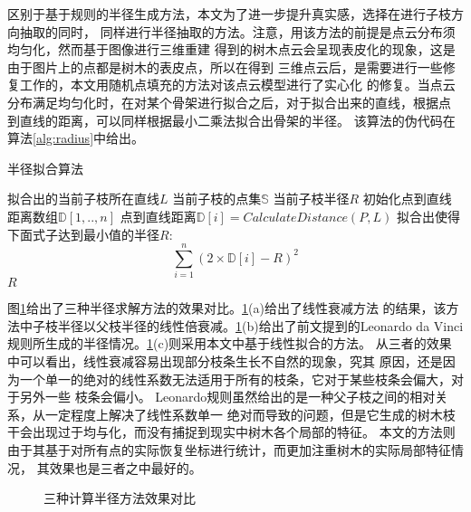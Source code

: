 区别于基于规则的半径生成方法，本文为了进一步提升真实感，选择在进行子枝方向抽取的同时，
同样进行半径抽取的方法。注意，用该方法的前提是点云分布须均匀化，然而基于图像进行三维重建
得到的树木点云会呈现表皮化的现象，这是由于图片上的点都是树木的表皮点，所以在得到
三维点云后，是需要进行一些修复工作的，本文用随机点填充的方法对该点云模型进行了实心化
的修复。当点云分布满足均匀化时，在对某个骨架进行拟合之后，对于拟合出来的直线，根据点
到直线的距离，可以同样根据最小二乘法拟合出骨架的半径。
该算法的伪代码在算法\ref{alg:radius}中给出。\\

\begin{algorithm}[H]
	\caption{半径拟合算法}
	\label{alg:radius}
	\begin{algorithmic}[1] 
		\Require 拟合出的当前子枝所在直线$L$
		\Require 当前子枝的点集$\mathbb{S}$
		\Ensure 当前子枝半径$R$
		\State 初始化点到直线距离数组$\mathbb{D}[1,..,n]$
		\State 点到直线距离$\mathbb{D}[i]=CalculateDistance(P, L)$
		\EndFor
		\State 拟合出使得下面式子达到最小值的半径$R$:\[ \sum_{i=1}^n (2\times \mathbb{D}[i] - R)^2  \]
		\State \Return $R$
	\end{algorithmic}
\end{algorithm}

图\ref{fig:radius}给出了三种半径求解方法的效果对比。\ref{fig:radius}(a)给出了线性衰减方法
的结果，该方法中子枝半径以父枝半径的线性倍衰减。\ref{fig:radius}(b)给出了前文提到的Leonardo
 da Vinci规则所生成的半径情况。\ref{fig:radius}(c)则采用本文中基于线性拟合的方法。
 从三者的效果中可以看出，线性衰减容易出现部分枝条生长不自然的现象，究其
 原因，还是因为一个单一的绝对的线性系数无法适用于所有的枝条，它对于某些枝条会偏大，对于另外一些
 枝条会偏小。 Leonardo规则虽然给出的是一种父子枝之间的相对关系，从一定程度上解决了线性系数单一
 绝对而导致的问题，但是它生成的树木枝干会出现过于均与化，而没有捕捉到现实中树木各个局部的特征。
 本文的方法则由于其基于对所有点的实际恢复坐标进行统计，而更加注重树木的实际局部特征情况，
 其效果也是三者之中最好的。
 \begin{figure}[H]
	\centering
	\hspace{4em}
	\hspace{4em}
	\hspace{4em}
	\hspace{4em}
	\caption{三种计算半径方法效果对比}
	\label{fig:radius}
\end{figure}


